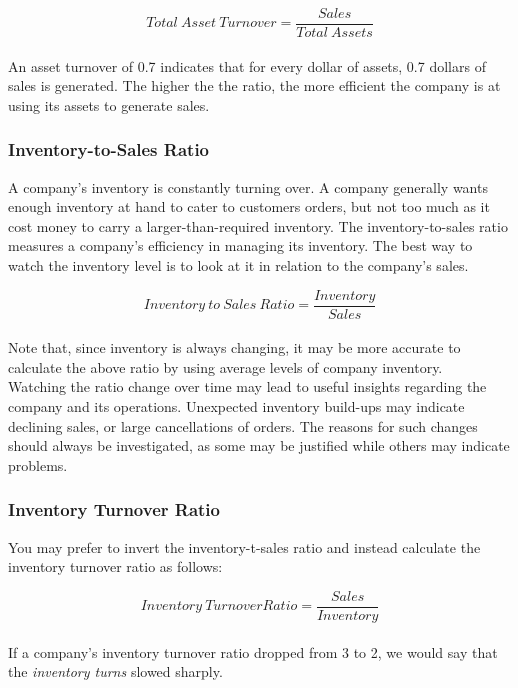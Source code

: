 \documentclass{article}
\begin{document}
 \begin{equation}
    Total\: Asset\:Turnover = \frac{Sales}{Total\: Assets} 
\end{equation}\\

An asset turnover of 0.7 indicates that for every dollar of assets, 0.7 dollars of sales is generated. The higher the the ratio, the more efficient the company is at using its assets to generate sales. 

\subsubsection{Inventory-to-Sales Ratio}
A company's inventory is constantly turning over. A company generally wants enough inventory at hand to cater to customers orders, but not too much as it cost money to carry a larger-than-required inventory. The inventory-to-sales ratio measures a company's efficiency in managing its inventory. The best way to watch the inventory level is to look at it in relation to the company's sales. 

\begin{equation}
    Inventory\:to\:Sales\: Ratio = \frac{Inventory}{Sales} 
\end{equation}\\

Note that, since inventory is always changing, it may be more accurate to calculate the above ratio by using average levels of company inventory. \\

Watching the ratio change over time may lead to useful insights regarding the company and its operations. Unexpected inventory build-ups may indicate declining sales, or large cancellations of orders. The reasons for such changes should always be investigated, as some may be justified while others may indicate problems. 

\subsubsection{Inventory Turnover Ratio}
You may prefer to invert the inventory-t-sales ratio and instead calculate the inventory turnover ratio as follows:

\begin{equation}
    Inventory\: Turnover Ratio = \frac{Sales}{Inventory} 
\end{equation}\\

If a company's inventory turnover ratio dropped from 3 to 2, we would say that the \textit{inventory turns} slowed sharply.\\
\end{document}
